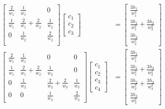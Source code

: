 \documentclass{article}
\begin{document}
\begin{align*}
  \begin{bmatrix}
    \frac{2}{w_1} & \frac{1}{w_1} & 0 \\
    \frac{1}{w_1} & \frac{2}{w_1}+\frac{2}{w_2} & \frac{1}{w_2} \\
    0 & \frac{1}{w_2} & \frac{2}{w_2} \\
  \end{bmatrix}
  \begin{bmatrix}
    c_1 \\ c_2 \\ c_3
  \end{bmatrix}
  &=
  \begin{bmatrix}
    \frac{3h_1}{w_1^2} \\
    \frac{3h_1}{w_1^2}+\frac{3h_2}{w_2^2} \\
    \frac{3h_2}{w_2^2}
  \end{bmatrix} \\
  \begin{bmatrix}
    \frac{2}{w_1} & \frac{1}{w_1} & 0 & 0 \\
    \frac{1}{w_1} & \frac{2}{w_1}+\frac{2}{w_2} & \frac{1}{w_2} & 0 \\
    0 & \frac{1}{w_2} & \frac{2}{w_2}+\frac{2}{w_3} & \frac{1}{w_3} \\
    0 & 0 & \frac{1}{w_3} & \frac{2}{w_3}
  \end{bmatrix}
  \begin{bmatrix}
    c_1 \\ c_2 \\ c_3 \\ c_4
  \end{bmatrix}
  &=
  \begin{bmatrix}
    \frac{3h_1}{w_1^2} \\
    \frac{3h_1}{w_1^2}+\frac{3h_2}{w_2^2} \\
    \frac{3h_2}{w_2^2}+\frac{3h_3}{w_3^2} \\
    \frac{3h_3}{w_3^2}
  \end{bmatrix}
\end{align*}
\end{document}
